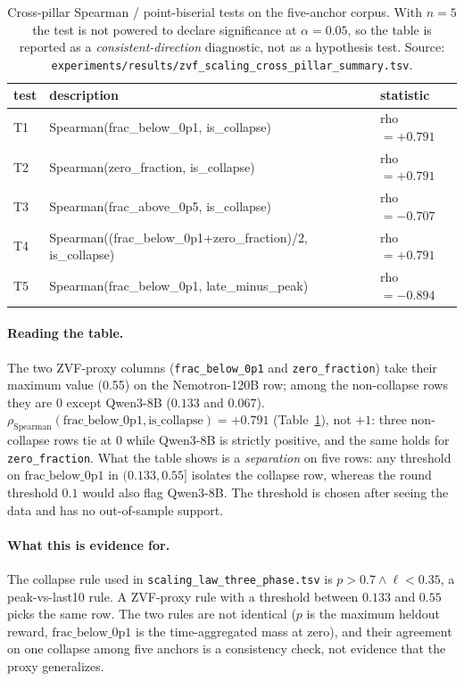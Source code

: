 \begin{table}[htbp]
\centering
\small
\begin{tabular}{lll}
\toprule
test & description & statistic \\
\midrule
T1 & Spearman(frac_below_0p1, is_collapse) & rho$ = +0.791$ \\
T2 & Spearman(zero_fraction, is_collapse) & rho$ = +0.791$ \\
T3 & Spearman(frac_above_0p5, is_collapse) & rho$ = -0.707$ \\
T4 & Spearman((frac_below_0p1+zero_fraction)/2, is_collapse) & rho$ = +0.791$ \\
T5 & Spearman(frac_below_0p1, late_minus_peak) & rho$ = -0.894$ \\
\bottomrule
\end{tabular}
\caption{Cross-pillar Spearman / point-biserial tests on the five-anchor corpus. With $n=5$ the test is not powered to declare significance at $\alpha=0.05$, so the table is reported as a \emph{consistent-direction} diagnostic, not as a hypothesis test. Source: \texttt{experiments/results/zvf\_scaling\_cross\_pillar\_summary.tsv}.}
\label{tab:zvf-scaling-tests}
\end{table}

\paragraph{Reading the table.}
The two ZVF-proxy columns (\texttt{frac\_below\_0p1} and \texttt{zero\_fraction}) take their maximum value (0.55) on the Nemotron-120B row; among the non-collapse rows they are $0$ except Qwen3-8B ($0.133$ and $0.067$). $\rho_{\mathrm{Spearman}}(\text{frac\_below\_0p1}, \text{is\_collapse}) = +0.791$ (Table~\ref{tab:zvf-scaling-tests}), not $+1$: three non-collapse rows tie at $0$ while Qwen3-8B is strictly positive, and the same holds for \texttt{zero\_fraction}. What the table shows is a \emph{separation} on five rows: any threshold on $\text{frac\_below\_0p1}$ in $(0.133, 0.55]$ isolates the collapse row, whereas the round threshold $0.1$ would also flag Qwen3-8B. The threshold is chosen after seeing the data and has no out-of-sample support.

\paragraph{What this is evidence for.}
The collapse rule used in \texttt{scaling\_law\_three\_phase.tsv} is $p > 0.7 \wedge \ell < 0.35$, a peak-vs-last10 rule. A ZVF-proxy rule with a threshold between $0.133$ and $0.55$ picks the same row. The two rules are not identical ($p$ is the maximum heldout reward, $\text{frac\_below\_0p1}$ is the time-aggregated mass at zero), and their agreement on one collapse among five anchors is a consistency check, not evidence that the proxy generalizes.

